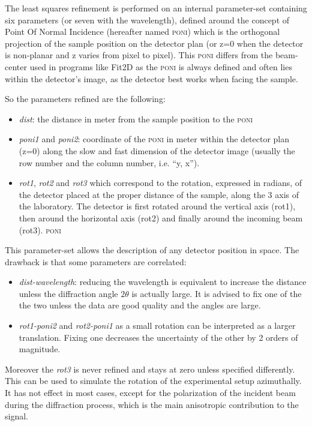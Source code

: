 \documentclass[preprint]{iucr}              %
\begin{document}
The least squares refinement is performed on an internal parameter-set
containing six  parameters (or seven with the wavelength), defined around the
concept of Point Of Normal Incidence (hereafter named \textsc{poni}) which is
the orthogonal projection  of the sample position on the detector plan 
(or z=0 when the detector is non-planar and z varies from pixel to pixel).
This \textsc{poni} differs from the beam-center used in programs like
Fit2D \cite{fit2d} as the \textsc{poni} is always defined and often lies within
the detector's image, as the detector best works when facing the sample.

So the parameters refined are the following:
\begin{itemize}
  \item \textit{dist}: the distance in meter from the sample position to the
  \textsc{poni}
  \item \textit{poni1} and \textit{poni2}: coordinate of the
  \textsc{poni} in meter within the detector plan (z=0) along the slow and fast
  dimension of the detector image (usually the row number and the column
  number, i.e. ``y, x'').
  \item \textit{rot1}, \textit{rot2} and \textit{rot3} which correspond to the
  rotation, expressed in radians, of the detector placed at the proper
  distance of the sample, along the 3 axis of the laboratory. The detector is
  first rotated around the vertical axis (rot1), then around the horizontal axis
  (rot2) and finally around the incoming beam (rot3). 
  \textsc{poni}
\end{itemize}

This parameter-set allows the description of any detector position in space.
The drawback is that some parameters are correlated: 
\begin{itemize}
  \item \textit{dist-wavelength}: reducing the wavelength is equivalent to
  increase the distance unless the diffraction angle $2\theta$ is actually
  large. It is advised to fix one of the the two unless the data are good
  quality and the angles are large.
  \item \textit{rot1-poni2} and \textit{rot2-poni1} as a small rotation can be
  interpreted as a larger translation. Fixing one decreases the uncertainty of
  the other by 2 orders of magnitude.
\end{itemize}

Moreover the \textit{rot3} is never refined and stays at zero unless specified
differently.  This can be used to simulate the rotation of the
experimental setup azimuthally. It has not effect in most cases, except for the
polarization of the incident beam during the diffraction process, which is the
main anisotropic contribution to the signal.
\end{document}
